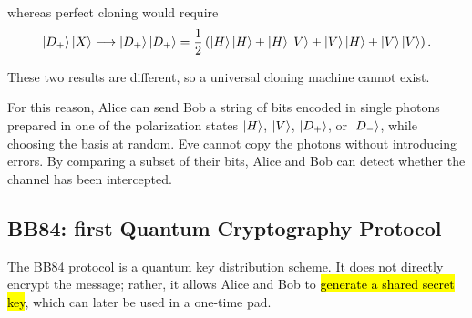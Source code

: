 whereas perfect cloning would require
\[
\ket{D_+}\ket{X} \longrightarrow \ket{D_+}\ket{D_+}
= \frac{1}{2}\left(\ket{H}\ket{H}+\ket{H}\ket{V}+\ket{V}\ket{H}+\ket{V}\ket{V}\right).
\]

These two results are different, so a universal cloning machine cannot exist.


For this reason, Alice can send Bob a string of bits encoded in single photons prepared in one of the polarization states $\ket{H}$, $\ket{V}$, $\ket{D_+}$, or $\ket{D_-}$, while choosing the basis at random. Eve cannot copy the photons without introducing errors. By comparing a subset of their bits, Alice and Bob can detect whether the channel has been intercepted.

\subsection{BB84: first Quantum Cryptography Protocol}\label{subsec:BB84}
The BB84 protocol is a quantum key distribution scheme. It does not directly encrypt the message; rather, it allows Alice and Bob to \hl{generate a shared secret key}, which can later be used in a one-time pad.

